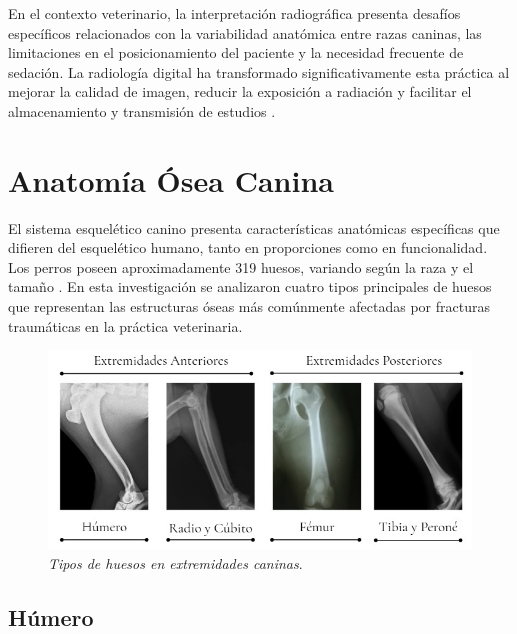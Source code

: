 {En el contexto veterinario, la interpretación radiográfica presenta desafíos específicos relacionados con la variabilidad anatómica entre razas caninas, las limitaciones en el posicionamiento del paciente y la necesidad frecuente de sedación. La radiología digital ha transformado significativamente esta práctica al mejorar la calidad de imagen, reducir la exposición a radiación y facilitar el almacenamiento y transmisión de estudios \cite{mattoon2021digital}.


\section{Anatomía Ósea Canina}

El sistema esquelético canino presenta características anatómicas específicas que difieren del esquelético humano, tanto en proporciones como en funcionalidad. Los perros poseen aproximadamente 319 huesos, variando según la raza y el tamaño \cite{dyce2012anatomia}. En esta investigación se analizaron cuatro tipos principales de huesos que representan las estructuras óseas más comúnmente afectadas por fracturas traumáticas en la práctica veterinaria.

\begin{figure}[H]
\leavevmode
\begin{minipage}{\textwidth}
\begin{center}
\includegraphics[width=1\textwidth]{./capitulo_02/figures/Tipos_de_Huesos}
\caption{\textit{Tipos de huesos en extremidades caninas}. \label{fig:tipos_huesos}}
\end{center}
\end{minipage}
\end{figure}

\subsection{Húmero}

}
